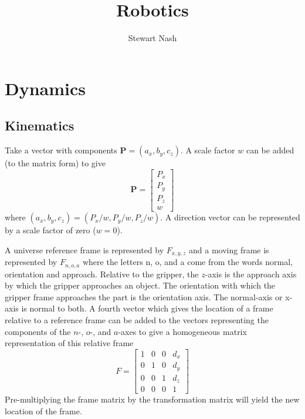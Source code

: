 \documentclass[11pt]{book}
\begin{document}
\title{Robotics}
\author{Stewart Nash}

\maketitle

\tableofcontents

\mainmatter

\chapter{Dynamics}

\section{Kinematics}
Take a vector with components $\mathbf{P}=(a_x,b_y,c_z)$. A scale factor $w$ can be added (to the matrix form) to give
\begin{equation}
	\mathbf{P}=
	\begin{bmatrix}
		P_x\\
		P_y\\
		P_z\\
		w
	\end{bmatrix}
\end{equation}
where $(a_x,b_y,c_z)=(P_x/w,P_y/w,P_z/w)$. A direction vector can be represented by a scale factor of zero ($w=0$).

A universe reference frame is represented by $F_{x,y,z}$ and a moving frame is represented by $F_{n,o,a}$ where the letters n, o, and a come from the words normal, orientation and approach. Relative to the gripper, the $z$-axis is the approach axis by which the gripper approaches an object. The orientation with which the gripper frame approaches the part is the orientation axis. The normal-axis or x-axis is normal to both. A fourth vector which gives the location of a frame relative to a reference frame can be added to the vectors representing the components of the $n$-, $o$-, and $a$-axes to give a homogeneous matrix representation of this relative frame
\begin{equation}
	F=
	\begin{bmatrix}
		1&0&0&d_x\\
		0&1&0&d_y\\
		0&0&1&d_z\\
		0&0&0&1
	\end{bmatrix}
\end{equation}
Pre-multiplying the frame matrix by the transformation matrix will yield the new location of the frame.
\end{document}
